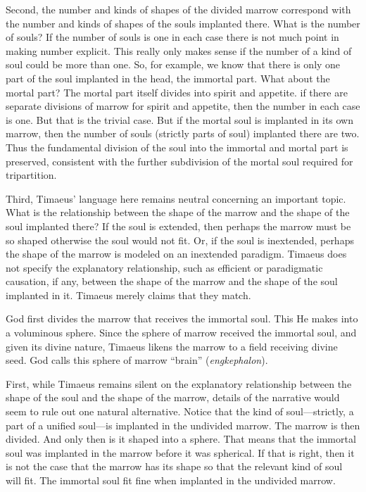 Second, the number and kinds of shapes of the divided marrow correspond with the number and kinds of shapes of the souls implanted there. What is the number of souls? If the number of souls is one in each case there is not much point in making number explicit. This really only makes sense if the number of a kind of soul could be more than one. So, for example, we know that there is only one part of the soul implanted in the head, the immortal part. What about the mortal part? The mortal part itself divides into spirit and appetite. if there are separate divisions of marrow for spirit and appetite, then the number in each case is one. But that is the trivial case. But if the mortal soul is implanted in its own marrow, then the number of souls (strictly parts of soul) implanted there are two. Thus the fundamental division of the soul into the immortal and mortal part is preserved, consistent with the further subdivision of the mortal soul required for tripartition.

Third, Timaeus' language here remains neutral concerning an important topic. What is the relationship between the shape of the marrow and the shape of the soul implanted there? If the soul is extended, then perhaps the marrow must be so shaped otherwise the soul would not fit. Or, if the soul is inextended, perhaps the shape of the marrow is modeled on an inextended paradigm. Timaeus does not specify the explanatory relationship, such as efficient or paradigmatic causation, if any, between the shape of the marrow and the shape of the soul implanted in it. Timaeus merely claims that they match.

God first divides the marrow that receives the immortal soul. This He makes into a voluminous sphere. Since the sphere of marrow received the immortal soul, and given its divine nature, Timaeus likens the marrow to a field receiving divine seed. God calls this sphere of marrow ``brain'' (\emph{engkephalon}).

First, while Timaeus remains silent on the explanatory relationship between the shape of the soul and the shape of the marrow, details of the narrative would seem to rule out one natural alternative. Notice that the kind of soul---strictly, a part of a unified soul---is implanted in the undivided marrow. The marrow is then divided. And only then is it shaped into a sphere. That means that the immortal soul was implanted in the marrow before it was spherical. If that is right, then it is not the case that the marrow has its shape so that the relevant kind of soul will fit. The immortal soul fit fine when implanted in the undivided marrow.

